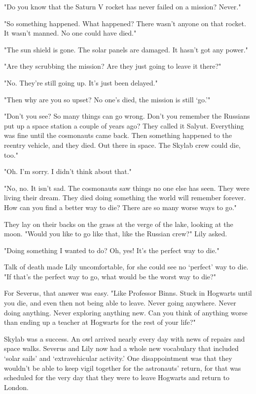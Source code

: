 "Do you know that the Saturn V rocket has never failed on a mission? Never."

"So something happened. What happened? There wasn't anyone on that rocket. It wasn't manned. No one could have died."

"The sun shield is gone. The solar panels are damaged. It hasn't got any power."

"Are they scrubbing the mission? Are they just going to leave it there?"

"No. They're still going up. It's just been delayed."

"Then why are you so upset? No one's died, the mission is still `go.'"

"Don't you see? So many things can go wrong. Don't you remember the Russians put up a space station a couple of years ago? They called it Salyut. Everything was fine until the cosmonauts came back. Then something happened to the reentry vehicle, and they{\el} died. Out there in space. The Skylab crew could die, too."

"Oh. I'm sorry. I didn't think about that."

"No, no. It isn't sad. The cosmonauts saw things no one else has seen. They were living their dream. They died doing something the world will remember forever. How can you find a better way to die? There are so many worse ways to go."

They lay on their backs on the grass at the verge of the lake, looking at the moon. "Would you like to go like that, like the Russian crew?" Lily asked.

"Doing something I wanted to do? Oh, yes! It's the perfect way to die."

Talk of death made Lily uncomfortable, for she could see no `perfect' way to die. "If that's the perfect way to go, what would be the worst way to die?"

For Severus, that answer was easy. "Like Professor Binns. Stuck in Hogwarts until you die, and even then not being able to leave. Never going anywhere. Never doing anything. Never exploring anything new. Can you think of anything worse than ending up a teacher at Hogwarts for the rest of your life?"

Skylab was a success. An owl arrived nearly every day with news of repairs and space walks. Severus and Lily now had a whole new vocabulary that included `solar sails' and `extravehicular activity.' One disappointment was that they wouldn't be able to keep vigil together for the astronauts' return, for that was scheduled for the very day that they were to leave Hogwarts and return to London.

